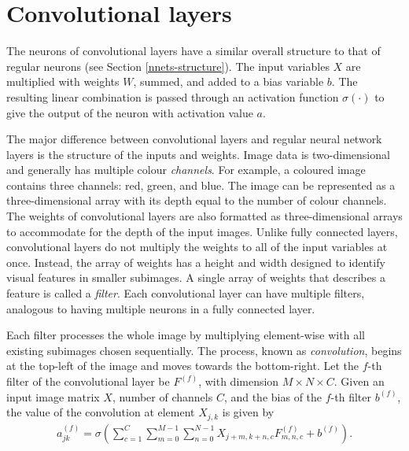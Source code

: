 \section{Convolutional layers}\label{convnets-convlayer}

The neurons of convolutional layers have a similar overall structure to that of regular neurons (see Section \ref{nnets-structure}). The input variables $X$ are multiplied with weights $W$, summed, and added to a bias variable $b$. The resulting linear combination is passed through an activation function $\sigma(\cdot)$ to give the output of the neuron with activation value $a$.

The major difference between convolutional layers and regular neural network layers is the structure of the inputs and weights. Image data is two-dimensional and generally has multiple colour \textit{channels}. For example, a coloured image contains three channels: red, green, and blue. The image can be represented as a three-dimensional array with its depth equal to the number of colour channels. The weights of convolutional layers are also formatted as three-dimensional arrays to accommodate for the depth of the input images. Unlike fully connected layers, convolutional layers do not multiply the weights to all of the input variables at once. Instead, the array of weights has a height and width designed to identify visual features in smaller subimages. A single array of weights that describes a feature is called a \textit{filter}. Each convolutional layer can have multiple filters, analogous to having multiple neurons in a fully connected layer.

Each filter processes the whole image by multiplying element-wise with all existing subimages chosen sequentially. The process, known as \textit{convolution}, begins at the top-left of the image and moves towards the bottom-right. Let the $f$-th filter of the convolutional layer be $F^{(f)}$, with dimension $M\times N \times C$. Given an input image matrix $X$, number of channels $C$, and the bias of the $f$-th filter $b^{(f)}$, the value of the convolution at element $X_{j,k}$ is given by
\begin{align}
	a_{jk}^{(f)} = \sigma\left(\sum_{c=1}^C\sum_{m=0}^{M-1}\sum_{n=0}^{N-1}X_{j+m, k+n, c}F_{m,n,c}^{(f)}  + b^{(f)}\right).
\end{align}


